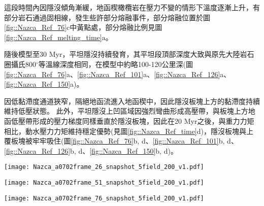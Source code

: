 
這段時間內因隱沒傾角漸緩，地函楔橄欖岩在壓力不變的情形下溫度逐漸上升，有部分岩石通過固相線，發生些許部分熔融事件，部分熔融位置於圖\ref{fig::Nazca_Ref_76}c中黃點處，部分熔融比例見圖\ref{fig::Nazca_Ref_melting_time}a。

隨後模型至30 Myr，平坦隱沒持續發育，其平坦段頂部深度大致與原先大陸岩石圈攝氏800$^{\circ}$等溫線深度相同，在模型中約略100-120公里深(圖\ref{fig::Nazca_Ref_76}a、\ref{fig::Nazca_Ref_101}a、\ref{fig::Nazca_Ref_126}a、\ref{fig::Nazca_Ref_150}a)。

因低黏滯度通道狹窄，隔絕地函流進入地函楔中，因此隱沒板塊上方的黏滯度持續維持低壓狀態。
此外，平坦隱沒上凹區域因強烈彎曲形成高壓帶，與板塊上方地函低壓帶形成的壓力梯度同樣垂直於隱沒板塊，因此在20 Myr之後，與重力力矩相比，動水壓力力矩維持穩定優勢(見圖\ref{fig::Nazca_Ref_time}d)，隱沒板塊與上覆板塊被牢牢吸住(圖\ref{fig::Nazca_Ref_76}b, d、\ref{fig::Nazca_Ref_101}b, d、\ref{fig::Nazca_Ref_126}b, d、\ref{fig::Nazca_Ref_150}b, d)。


\begin{figure*}[htp]
    \centering
    \texttt{[image: Nazca\_a0702frame\_26\_snapshot\_5field\_200\_v1.pdf]}
    \caption[智利參考模型於5 Myr時之結果]{智利參考模型於5 Myr時之結果。其中(a)為岩相剖面，圖中實線為攝氏200-1200度等溫線，粉紅虛線為攝氏1330度等溫線。(b)為黏滯度剖面，(c)為密度剖面，黃點標示部分熔融位置，(d)為動水壓力剖面，(e)為應變率第二不變量。圖(b)-(e)中的灰色實線繪攝氏400$^{\circ}$、600$^{\circ}$與800$^{\circ}$等溫線。}
    \label{fig::Nazca_Ref_26}
\end{figure*}

\begin{figure*}[htp]
    \centering
    \texttt{[image: Nazca\_a0702frame\_51\_snapshot\_5field\_200\_v1.pdf]}
    \caption[智利參考模型於10 Myr時之結果]{智利參考模型於10 Myr時之結果。}
    \label{fig::Nazca_Ref_51}
\end{figure*}

\begin{figure*}[htp]
    \centering
    \texttt{[image: Nazca\_a0702frame\_76\_snapshot\_5field\_200\_v1.pdf]}
    \caption[智利參考模型於15 Myr時之結果]{智利參考模型於15 Myr時之結果。}
    \label{fig::Nazca_Ref_76}
\end{figure*}

